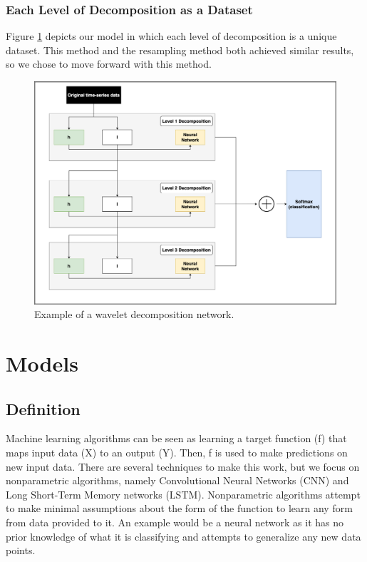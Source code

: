 \documentclass{turabian-thesis}
\begin{document}
\subsection{Each Level of Decomposition as a Dataset}
Figure \ref{fig:wavelet_decomp} depicts our model in which each level of decomposition is a unique dataset. This method and the resampling method both achieved similar results, so we chose to move forward with this method.



\begin{figure}[h!]
   \begin{center}
      \includegraphics[scale=0.35]{../media/wavelet_decomp.png}
   \end{center}
   \caption{Example of a wavelet decomposition network.}
   \label{fig:wavelet_decomp}
\end{figure}


\chapter{Models}
\label{chap:models}



\section{Definition}
Machine learning algorithms can be seen as learning a target function (f) that maps input data (X) to an output (Y). Then, f is used to make predictions on new input data. There are several techniques to make this work, but we focus on nonparametric algorithms, namely Convolutional Neural Networks (CNN) and Long Short-Term Memory networks (LSTM). Nonparametric algorithms attempt to make minimal assumptions about the form of the function to learn any form from data provided to it. An example would be a neural network as it has no prior knowledge of what it is classifying and attempts to generalize any new data points.
\end{document}
